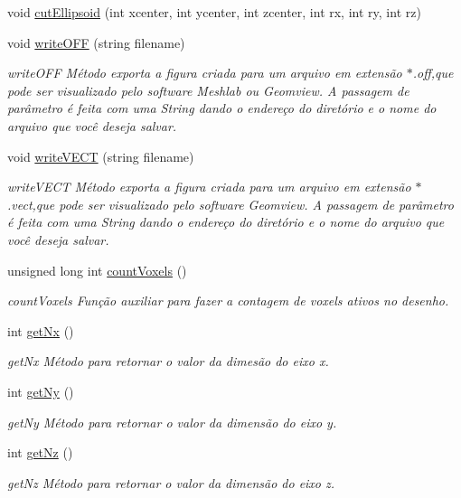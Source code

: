 \begin{DoxyCompactItemize}
\item 
void \mbox{\hyperlink{classsculptor3d_ab65ed666a86d01f428d6f735ad860cc6}{cut\+Ellipsoid}} (int xcenter, int ycenter, int zcenter, int rx, int ry, int rz)
\item 
void \mbox{\hyperlink{classsculptor3d_a7d9b24f6775441135936b184bb4079e0}{write\+O\+FF}} (string filename)
\begin{DoxyCompactList}\small\item\em write\+O\+FF Método exporta a figura criada para um arquivo em extensão $\ast$.off,que pode ser visualizado pelo software Meshlab ou Geomview. A passagem de parâmetro é feita com uma String dando o endereço do diretório e o nome do arquivo que você deseja salvar. \end{DoxyCompactList}\item 
void \mbox{\hyperlink{classsculptor3d_a60f471805c52556e564477beccc72f6b}{write\+V\+E\+CT}} (string filename)
\begin{DoxyCompactList}\small\item\em write\+V\+E\+CT Método exporta a figura criada para um arquivo em extensão $\ast$.vect,que pode ser visualizado pelo software Geomview. A passagem de parâmetro é feita com uma String dando o endereço do diretório e o nome do arquivo que você deseja salvar. \end{DoxyCompactList}\item 
unsigned long int \mbox{\hyperlink{classsculptor3d_a39cb80b54a93e7e2cf8b2beddd7f1b74}{count\+Voxels}} ()
\begin{DoxyCompactList}\small\item\em count\+Voxels Função auxiliar para fazer a contagem de voxels ativos no desenho. \end{DoxyCompactList}\item 
int \mbox{\hyperlink{classsculptor3d_a6f5974b59748b404ac44fef855dbf9ee}{get\+Nx}} ()
\begin{DoxyCompactList}\small\item\em get\+Nx Método para retornar o valor da dimesão do eixo x. \end{DoxyCompactList}\item 
int \mbox{\hyperlink{classsculptor3d_aa354fdd753a7567f782971893f63e05a}{get\+Ny}} ()
\begin{DoxyCompactList}\small\item\em get\+Ny Método para retornar o valor da dimensão do eixo y. \end{DoxyCompactList}\item 
int \mbox{\hyperlink{classsculptor3d_ab393938c4dfdf621eb966d73b82bf705}{get\+Nz}} ()
\begin{DoxyCompactList}\small\item\em get\+Nz Método para retornar o valor da dimensão do eixo z. \end{DoxyCompactList}\end{DoxyCompactItemize}

